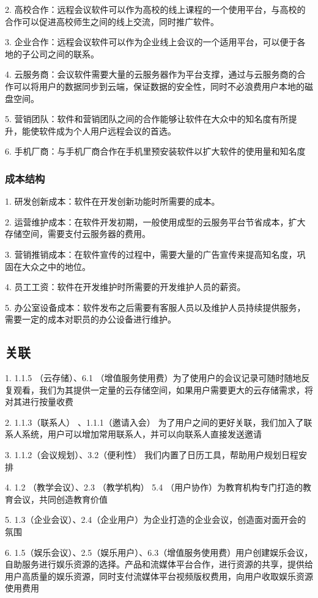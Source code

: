 \documentclass[a4paper,12pt]{article}
\begin{document}
    2. 高校合作：远程会议软件可以作为高校的线上课程的一个使用平台，与高校的合作可以促进高校师生之间的线上交流，同时推广软件。

    3. 企业合作：远程会议软件可以作为企业线上会议的一个适用平台，可以便于各地的子公司之间的联系。

    4. 云服务商：会议软件需要大量的云服务器作为平台支撑，通过与云服务商的合作可以将用户的数据同步到云端，保证数据的安全性，同时不必浪费用户本地的磁盘空间。

    5. 营销团队：软件和营销团队之间的合作能够让软件在大众中的知名度有所提升，能使软件成为个人用户远程会议的首选。

    6. 手机厂商：与手机厂商合作在手机里预安装软件以扩大软件的使用量和知名度
    \subsubsection{成本结构}
    1. 研发创新成本：软件在开发创新功能时所需要的成本。

    2. 运营维护成本：在软件开发初期，一般使用成型的云服务平台节省成本，扩大存储空间，需要支付云服务器的费用。

    3. 营销推销成本：在软件宣传的过程中，需要大量的广告宣传来提高知名度，巩固在大众之中的地位。

    4. 员工工资：软件在开发维护时所需要的开发维护人员的薪资。

    5. 办公室设备成本：软件发布之后需要有客服人员以及维护人员持续提供服务，需要一定的成本对职员的办公设备进行维护。

    \subsection{关联}
    1. 1.1.5 （云存储）、6.1 （增值服务使用费）为了使用户的会议记录可随时随地反复观看，我们为其提供一定量的云存储空间，如果用户需要更大的云存储需求，将对其进行按量收费

    2. 1.1.3（联系人） 、1.1.1（邀请入会） 为了用户之间的更好关联，我们加入了联系人系统，用户可以增加常用联系人，并可以向联系人直接发送邀请

    3. 1.1.2（会议规划）、3.2（便利性） 我们内置了日历工具，帮助用户规划日程安排

    4. 1.2 （教学会议）、2.3 （教学机构） 5.4 （用户协作）为教育机构专门打造的教育会议，共同创造教育价值

    5. 1.3（企业会议）、2.4（企业用户）为企业打造的企业会议，创造面对面开会的氛围

    6. 1.5（娱乐会议）、2.5（娱乐用户）、6.3（增值服务使用费）用户创建娱乐会议，自助服务进行娱乐资源的选择。产品和流媒体平台合作，进行资源的共享，提供给用户高质量的娱乐资源，同时支付流媒体平台视频版权费用，向用户收取娱乐资源使用费用
\end{document}
